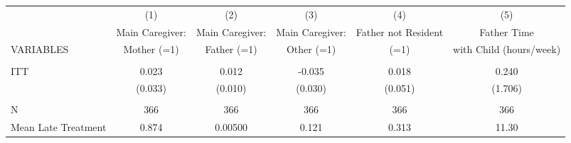 \begin{tabular}{lccccc} \hline
 & (1) & (2) & (3) & (4) & (5) \\
 & Main Caregiver: & Main Caregiver: & Main Caregiver: & Father not Resident & Father Time \\
VARIABLES & Mother (=1) & Father (=1) & Other (=1) & (=1) & with Child (hours/week) \\ \hline
 &  &  &  &  &  \\
ITT & 0.023 & 0.012 & -0.035 & 0.018 & 0.240 \\
 & (0.033) & (0.010) & (0.030) & (0.051) & (1.706) \\
 &  &  &  &  &  \\
N & 366 & 366 & 366 & 366 & 366 \\
 Mean Late Treatment & 0.874 & 0.00500 & 0.121 & 0.313 & 11.30 \\ \hline
\end{tabular}

